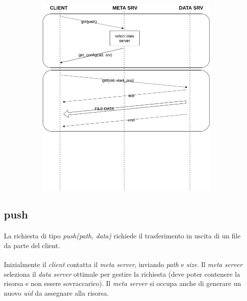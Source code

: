 \documentclass{article}
\begin{document}
\begin{figure}[H]
	\centering
	\begin{subfigure}{0.80\linewidth}
		\includegraphics[width=\linewidth]{../diagrams/requests/get_request.png}
	\end{subfigure}
\end{figure}


\subsection{push}

\paragraph{} La richiesta di tipo \emph{push(path, data)} richiede il trasferimento in uscita di un file da parte del client. 

\paragraph{} Inizialmente il \emph{client} contatta il \emph{meta server}, inviando \emph{path} e \emph{size}. Il \emph{meta server} seleziona il \emph{data server} ottimale per gestire la richiesta (deve poter contenere la risorsa e non essere sovraccarico). Il \emph{meta server} si occupa anche di generare un nuovo \emph{uid} da assegnare alla risorsa. 
\end{document}

